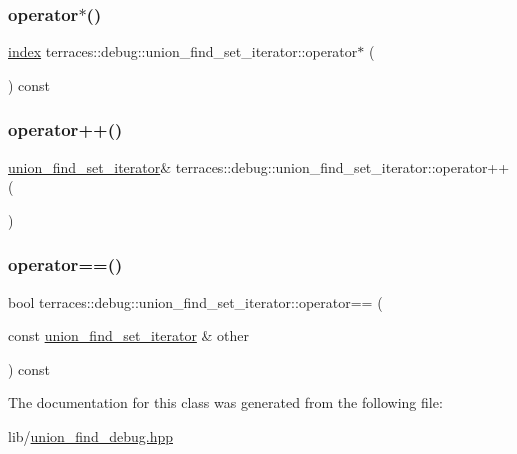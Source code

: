\subsubsection{\texorpdfstring{operator$\ast$()}{operator*()}}
{\footnotesize\ttfamily \hyperlink{namespaceterraces_adbc33ccb543d1634e96d0eb02e472c77}{index} terraces\+::debug\+::union\+\_\+find\+\_\+set\+\_\+iterator\+::operator$\ast$ (\begin{DoxyParamCaption}{ }\end{DoxyParamCaption}) const\hspace{0.3cm}{\ttfamily [inline]}}

\mbox{\label{classterraces_1_1debug_1_1union__find__set__iterator_a99ac5c002ced436bf701e289338dc101}} 
\subsubsection{\texorpdfstring{operator++()}{operator++()}}
{\footnotesize\ttfamily \hyperlink{classterraces_1_1debug_1_1union__find__set__iterator}{union\+\_\+find\+\_\+set\+\_\+iterator}\& terraces\+::debug\+::union\+\_\+find\+\_\+set\+\_\+iterator\+::operator++ (\begin{DoxyParamCaption}{ }\end{DoxyParamCaption})\hspace{0.3cm}{\ttfamily [inline]}}

\mbox{\label{classterraces_1_1debug_1_1union__find__set__iterator_aa78c12fe312fe778ba56354458bee4bb}} 
\subsubsection{\texorpdfstring{operator==()}{operator==()}}
{\footnotesize\ttfamily bool terraces\+::debug\+::union\+\_\+find\+\_\+set\+\_\+iterator\+::operator== (\begin{DoxyParamCaption}\item[{const \hyperlink{classterraces_1_1debug_1_1union__find__set__iterator}{union\+\_\+find\+\_\+set\+\_\+iterator} \&}]{other }\end{DoxyParamCaption}) const\hspace{0.3cm}{\ttfamily [inline]}}



The documentation for this class was generated from the following file\+:\begin{DoxyCompactItemize}
\item 
lib/\hyperlink{union__find__debug_8hpp}{union\+\_\+find\+\_\+debug.\+hpp}\end{DoxyCompactItemize}
